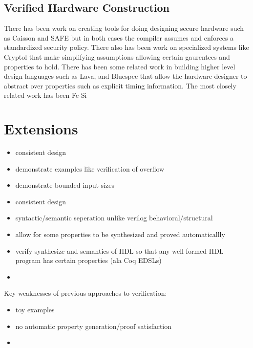\documentclass[12pt, titlepage]{article}
\begin{document}
\subsection{Verified Hardware Construction}
There has been work on creating tools for doing designing secure hardware such as Caisson and SAFE but in both cases the
compiler assumes and enforces a standardized security policy.  \cite{Li:2011:CHD:1993498.1993512}
There also has been work on specialized systems like Cryptol that make simplifying assumptions allowing certain gaurentees
and properties to hold. There has been some related work in building higher level design languages such as Lava, and Bluespec
that allow the hardware designer to abstract over properties such as explicit timing information. The most closely related
work has been Fe-Si \cite{fesi} \cite{Brady_constructingcorrect} \cite{cryptol2010}

\section{Extensions}

\begin{itemize}
    \item consistent design
    \item demonstrate examples like verification of overflow
    \item demonstrate bounded input sizes
\end{itemize}

\begin{itemize}
    \item consistent design
    \item syntactic/semantic seperation unlike verilog behavioral/structural
    \item allow for some properties to be synthesized and proved automaticallly
    \item verify synthesize and semantics of HDL so that any well formed HDL program has certain properties (ala Coq EDSLs)
    \item {} \cite{Ricketts:2014}
\end{itemize}

Key weaknesses of previous approaches to verification:
\begin{itemize}
    \item toy examples
    \item no automatic property generation/proof satisfaction
    \item 
\end{itemize}
\end{document}
